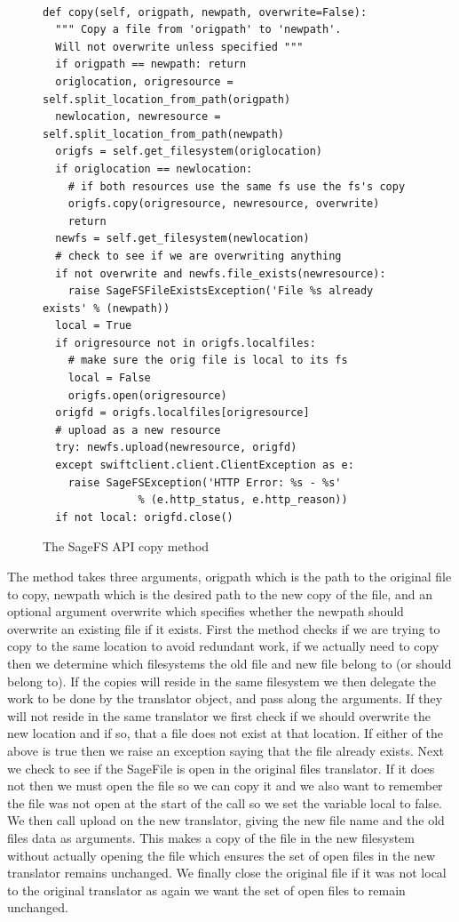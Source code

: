 \begin{figure}[h]
\begin{lstlisting}

def copy(self, origpath, newpath, overwrite=False):
  """ Copy a file from 'origpath' to 'newpath'.
  Will not overwrite unless specified """
  if origpath == newpath: return
  origlocation, origresource = self.split_location_from_path(origpath)
  newlocation, newresource = self.split_location_from_path(newpath)
  origfs = self.get_filesystem(origlocation)
  if origlocation == newlocation:
    # if both resources use the same fs use the fs's copy
    origfs.copy(origresource, newresource, overwrite)
    return
  newfs = self.get_filesystem(newlocation)
  # check to see if we are overwriting anything
  if not overwrite and newfs.file_exists(newresource):
    raise SageFSFileExistsException('File %s already exists' % (newpath))
  local = True
  if origresource not in origfs.localfiles:
    # make sure the orig file is local to its fs
    local = False
    origfs.open(origresource)
  origfd = origfs.localfiles[origresource]
  # upload as a new resource
  try: newfs.upload(newresource, origfd)
  except swiftclient.client.ClientException as e:
    raise SageFSException('HTTP Error: %s - %s' 
               % (e.http_status, e.http_reason))
  if not local: origfd.close() 

\end{lstlisting}
\caption{The SageFS API copy method}
\label{fig:sagecopy}
\end{figure}

The method takes three arguments, origpath which is the path to the original
file to copy, newpath which is the desired path to the new copy of the file,
and an optional argument overwrite which specifies whether the newpath should
overwrite an existing file if it exists. First the method checks if we are
trying to copy to the same location to avoid redundant work, if we actually
need to copy then we determine which filesystems the old file and new file
belong to (or should belong to). If the copies will reside in the same
filesystem we then delegate the work to be done by the translator object, and pass
along the arguments. If they will not reside in the same translator we first check if
we should overwrite the new location and if so, that a file does not exist at
that location. If either of the above is true then we raise an exception
saying that the file already exists. Next we check to see if the SageFile is
open in the original files translator. If it does not then we must open the file so we
can copy it and we also want to remember the file was not open at the start of
the call so we set the variable local to false. We then call upload on the new
translator, giving the new file name and the old files data as arguments. This makes a
copy of the file in the new filesystem without actually opening the file which
ensures the set of open files in the new translator remains unchanged. We finally
close the original file if it was not local to the original translator as again we
want the set of open files to remain unchanged.


